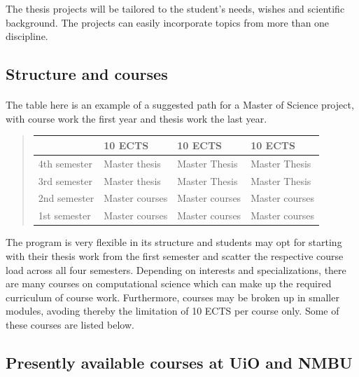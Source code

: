 \documentclass[%
oneside,                 %
final,                   %
10pt]{article}
\begin{document}
\noindent
The thesis projects will be tailored to the student's needs, wishes and scientific background. The projects can easily incorporate topics from more than one discipline.



\subsection*{Structure and courses}

\paragraph{}
The table here is an example of a suggested path for a Master of Science project,
with course work the first year and thesis work the last year.


\begin{quote}
\begin{tabular}{llll}
\hline
\multicolumn{1}{l}{  } & \multicolumn{1}{l}{ 10 ECTS } & \multicolumn{1}{l}{ 10 ECTS } & \multicolumn{1}{l}{ 10 ECTS } \\
\hline
4th semester & Master thesis  & Master Thesis  & Master Thesis  \\
\hline
3rd semester & Master thesis  & Master Thesis  & Master Thesis  \\
\hline
2nd semester & Master courses & Master courses & Master courses \\
\hline
1st semester & Master courses & Master courses & Master courses \\
\hline
\end{tabular}
\end{quote}

\noindent
The program is very flexible in its structure and students may opt for starting with their thesis
work from the first semester and scatter the respective course load across all four semesters.
Depending on interests and specializations, there are many courses on computational science which can make
up the required curriculum of course work. Furthermore, courses may be broken up in smaller modules,
avoding thereby the limitation of 10 ECTS per course only. Some of these courses are listed below.



\subsection*{Presently available courses at UiO and NMBU}
\end{document}
